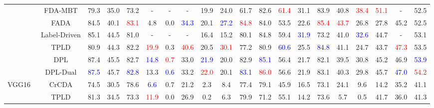\documentclass[10pt,twocolumn,letterpaper]{article}
\begin{document}
\begin{table*}[t!p]
\begin{tabular}{cccccccccccccccccccc}
				&FDA-MBT \cite{yang2020fda}   &
				79.3 & 35.0 & 73.2 &-&-&- &  19.9 &  24.0 & 61.7 & 82.6 &  \textcolor{red}{61.4} & 
				{31.1} &  83.9 & 40.8 &  \textcolor{red}{38.4} &  \textcolor{red}{51.1} &-& 52.5 \\
				
        &FADA\cite{wang2020classes} & 84.5&40.1&\textcolor{red}{83.1}&4.8&0.0&\textcolor{blue}{34.3}&{20.1}&\textcolor{blue}{27.2}&\textcolor{red}{84.8}&84.0&53.5&22.6&\textcolor{red}{85.4}&\textcolor{red}{43.7}&{26.8}&27.8&45.2&{52.5}\\	
				
        &Label-Driven\cite{yang2020label}& 85.1&44.5&81.0&-&-&-&16.4&15.2&80.1&84.8&59.4&\textcolor{blue}{31.9}&73.2&41.0&\textcolor{blue}{32.6}&44.7&-&53.1 \\

				
&TPLD \cite{Two-phase}&80.9 &44.3 &82.2 &\textcolor{red}{19.9}&0.3&\textcolor{red}{40.6}& 20.5& \textcolor{red}{30.1}& 77.2 &80.9& \textcolor{blue}{60.6}& 25.5& \textcolor{blue}{84.8}& 41.1& 24.7 &43.7&\textcolor{red}{47.3}& 53.5\\
\cline{2-20}
&DPL & 87.4&45.5&82.7&\textcolor{blue}{14.8}&\textcolor{red}{0.7}&33.0&\textcolor{blue}{21.9}&20.0&82.9&\textcolor{blue}{85.1}&56.4&21.7&82.1&39.5&30.8&45.2&46.9&\textcolor{blue}{53.9}

\\
&DPL-Dual&\textcolor{blue}{87.5}&45.7&\textcolor{blue}{82.8}&13.3&\textcolor{blue}{0.6}&33.2&\textcolor{red}{22.0}&20.1&\textcolor{blue}{83.1}&\textcolor{red}{86.0}&56.6&21.9&83.1&40.3&29.8&45.7&\textcolor{blue}{47.0}&\textcolor{red}{54.2}\\

\hline
\multirow{9}{*}{VGG16~\cite{simonyan2014very}}
&CrCDA \cite{huang2020contextual}        &74.5& 30.5& 78.6& \textcolor{blue}{6.6}& 0.7& 21.2& 2.3& 8.4& 77.4& 79.1& 45.9& 16.5& 73.1& 24.1& 9.6& 14.2& 35.2& 41.1\\

&TPLD \cite{Two-phase}&        81.3& 34.5& 73.3& \textcolor{red}{11.9}&0.0& 26.9& 0.2& 6.3& 79.9& 71.2& 55.1& 14.2& 73.6& 5.7& 0.5& 41.7& 36.0& 41.3  \\


\end{tabular}
\end{table*}
\end{document}
